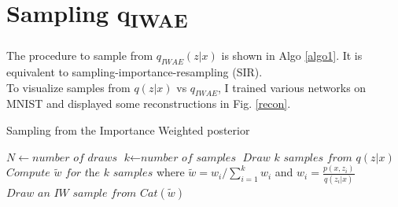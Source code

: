 \documentclass{article}
\begin{document}









\section{Sampling q\textsubscript{IWAE}}

The procedure to sample from $q_{IWAE}(z|x)$ is shown in Algo \ref{algo1}. It is equivalent to sampling-importance-resampling (SIR). \\
To visualize samples from $q(z|x)$ vs $q_{IWAE}$, I trained various networks on MNIST and displayed some reconstructions in Fig. \ref{recon}. 



\begin{algorithm}[H]
\caption{Sampling from the Importance Weighted posterior}\label{algo1}
\begin{algorithmic}[1]
    \State $N \gets \textit{number of draws}$
    \State $\textit{k} \gets \textit{number of samples}$
        \State $\textit{Draw k samples from}$ $q(z|x)$
        \State $\textit{Compute } \tilde{w} \textit{ for the k samples}$ where $\tilde w = w_i/\sum_{i=1}^{k} w_i$ and $w_i = \frac{p(x,z_i)}{q(z_i|x)}$
        \State $\textit{Draw an IW sample from } Cat(\tilde{w})$
    \EndFor
\end{algorithmic}
\end{algorithm}
\end{document}
